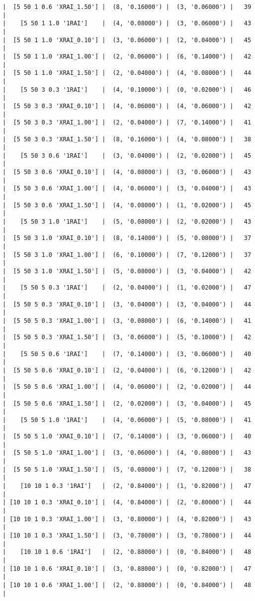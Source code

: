 \documentclass{article}
\begin{document}
\begin{verbatim}
|  [5 50 1 0.6 'XRAI_1.50'] |  (8, '0.16000') |  (3, '0.06000') |   39  |
|    [5 50 1 1.0 '1RAI']    |  (4, '0.08000') |  (3, '0.06000') |   43  |
|  [5 50 1 1.0 'XRAI_0.10'] |  (3, '0.06000') |  (2, '0.04000') |   45  |
|  [5 50 1 1.0 'XRAI_1.00'] |  (2, '0.06000') |  (6, '0.14000') |   42  |
|  [5 50 1 1.0 'XRAI_1.50'] |  (2, '0.04000') |  (4, '0.08000') |   44  |
|    [5 50 3 0.3 '1RAI']    |  (4, '0.10000') |  (0, '0.02000') |   46  |
|  [5 50 3 0.3 'XRAI_0.10'] |  (4, '0.06000') |  (4, '0.06000') |   42  |
|  [5 50 3 0.3 'XRAI_1.00'] |  (2, '0.04000') |  (7, '0.14000') |   41  |
|  [5 50 3 0.3 'XRAI_1.50'] |  (8, '0.16000') |  (4, '0.08000') |   38  |
|    [5 50 3 0.6 '1RAI']    |  (3, '0.04000') |  (2, '0.02000') |   45  |
|  [5 50 3 0.6 'XRAI_0.10'] |  (4, '0.08000') |  (3, '0.06000') |   43  |
|  [5 50 3 0.6 'XRAI_1.00'] |  (4, '0.06000') |  (3, '0.04000') |   43  |
|  [5 50 3 0.6 'XRAI_1.50'] |  (4, '0.08000') |  (1, '0.02000') |   45  |
|    [5 50 3 1.0 '1RAI']    |  (5, '0.08000') |  (2, '0.02000') |   43  |
|  [5 50 3 1.0 'XRAI_0.10'] |  (8, '0.14000') |  (5, '0.08000') |   37  |
|  [5 50 3 1.0 'XRAI_1.00'] |  (6, '0.10000') |  (7, '0.12000') |   37  |
|  [5 50 3 1.0 'XRAI_1.50'] |  (5, '0.08000') |  (3, '0.04000') |   42  |
|    [5 50 5 0.3 '1RAI']    |  (2, '0.04000') |  (1, '0.02000') |   47  |
|  [5 50 5 0.3 'XRAI_0.10'] |  (3, '0.04000') |  (3, '0.04000') |   44  |
|  [5 50 5 0.3 'XRAI_1.00'] |  (3, '0.08000') |  (6, '0.14000') |   41  |
|  [5 50 5 0.3 'XRAI_1.50'] |  (3, '0.06000') |  (5, '0.10000') |   42  |
|    [5 50 5 0.6 '1RAI']    |  (7, '0.14000') |  (3, '0.06000') |   40  |
|  [5 50 5 0.6 'XRAI_0.10'] |  (2, '0.04000') |  (6, '0.12000') |   42  |
|  [5 50 5 0.6 'XRAI_1.00'] |  (4, '0.06000') |  (2, '0.02000') |   44  |
|  [5 50 5 0.6 'XRAI_1.50'] |  (2, '0.02000') |  (3, '0.04000') |   45  |
|    [5 50 5 1.0 '1RAI']    |  (4, '0.06000') |  (5, '0.08000') |   41  |
|  [5 50 5 1.0 'XRAI_0.10'] |  (7, '0.14000') |  (3, '0.06000') |   40  |
|  [5 50 5 1.0 'XRAI_1.00'] |  (3, '0.06000') |  (4, '0.08000') |   43  |
|  [5 50 5 1.0 'XRAI_1.50'] |  (5, '0.08000') |  (7, '0.12000') |   38  |
|    [10 10 1 0.3 '1RAI']   |  (2, '0.84000') |  (1, '0.82000') |   47  |
| [10 10 1 0.3 'XRAI_0.10'] |  (4, '0.84000') |  (2, '0.80000') |   44  |
| [10 10 1 0.3 'XRAI_1.00'] |  (3, '0.80000') |  (4, '0.82000') |   43  |
| [10 10 1 0.3 'XRAI_1.50'] |  (3, '0.78000') |  (3, '0.78000') |   44  |
|    [10 10 1 0.6 '1RAI']   |  (2, '0.88000') |  (0, '0.84000') |   48  |
| [10 10 1 0.6 'XRAI_0.10'] |  (3, '0.88000') |  (0, '0.82000') |   47  |
| [10 10 1 0.6 'XRAI_1.00'] |  (2, '0.88000') |  (0, '0.84000') |   48  |

\end{verbatim}
\end{document}
